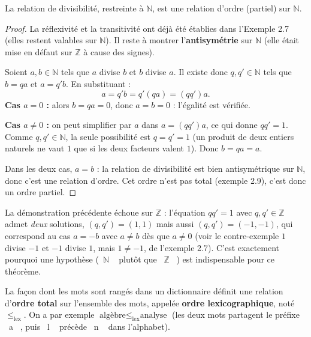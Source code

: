 \documentclass[a4paper,12pt,openany]{book}
\providecommand{\og}{\guillemotleft~}
\providecommand{\fg}{\ifhmode~\fi\guillemotright}
\begin{document}
\begin{theoreme}
La relation de divisibilité, restreinte à $\mathbb{N}$, est une relation
d'ordre (partiel) sur $\mathbb{N}$.
\end{theoreme}

\begin{proof}
La réflexivité et la transitivité ont déjà été établies dans l'Exemple 2.7
(elles restent valables sur $\mathbb{N}$). Il reste à montrer
l'\textbf{antisymétrie} sur $\mathbb{N}$ (elle était mise en défaut sur
$\mathbb{Z}$ à cause des signes).

Soient $a,b \in \mathbb{N}$ tels que $a$ divise $b$ et $b$ divise $a$. Il
existe donc $q,q' \in \mathbb{N}$ tels que $b=qa$ et $a=q'b$. En substituant :
\[
a = q'b = q'(qa) = (qq')a.
\]
\textbf{Cas $a=0$ :} alors $b=qa=0$, donc $a=b=0$ : l'égalité est vérifiée.

\textbf{Cas $a\neq 0$ :} on peut simplifier par $a$ dans $a=(qq')a$, ce qui
donne $qq'=1$. Comme $q,q'\in\mathbb{N}$, la seule possibilité est $q=q'=1$
(un produit de deux entiers naturels ne vaut $1$ que si les deux facteurs
valent $1$). Donc $b=qa=a$.

Dans les deux cas, $a=b$ : la relation de divisibilité est bien antisymétrique
sur $\mathbb{N}$, donc c'est une relation d'ordre. Cet ordre n'est pas total
(exemple 2.9), c'est donc un ordre partiel.
\end{proof}

\begin{remarque}
La démonstration précédente échoue sur $\mathbb{Z}$ : l'équation $qq'=1$ avec
$q,q'\in\mathbb{Z}$ admet \emph{deux} solutions, $(q,q')=(1,1)$ mais aussi
$(q,q')=(-1,-1)$, qui correspond au cas $a=-b$ avec $a\neq b$ dès que $a\neq
0$ (voir le contre-exemple $1$ divise $-1$ et $-1$ divise $1$, mais $1\neq
-1$, de l'exemple 2.7). C'est exactement pourquoi une hypothèse
(\og $\mathbb{N}$ \fg{} plutôt que \og $\mathbb{Z}$ \fg) est indispensable
pour ce théorème.
\end{remarque}

\begin{exemple}[2.10]
La façon dont les mots sont rangés dans un dictionnaire définit une relation
d'\textbf{ordre total} sur l'ensemble des mots, appelée \textbf{ordre
lexicographique}, noté $\leq_{\text{lex}}$. On a par exemple
$\text{alg\`ebre} \leq_{\text{lex}} \text{analyse}$ (les deux mots partagent
le préfixe \og a \fg, puis \og l \fg{} précède \og n \fg{} dans l'alphabet).
\end{exemple}
\end{document}
